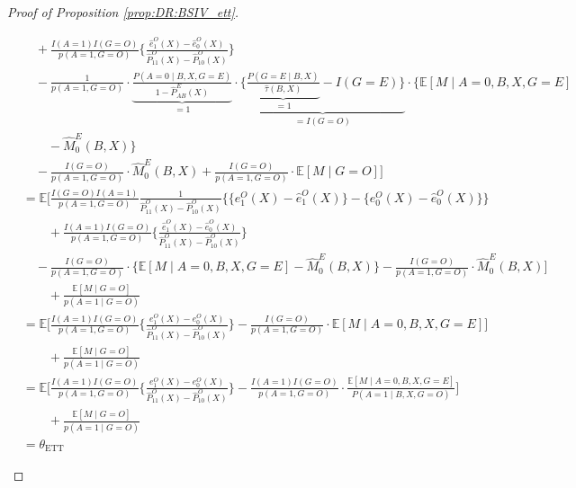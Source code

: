 \documentclass[10pt]{article}
\newcommand{\E}{\mathbb{E}}
\begin{document}
\begin{proof}[Proof of Proposition \ref{prop:DR:BSIV_ett}]
\begin{itemize}
{\begin{align*}
&\quad+\frac{I(A=1)I(G=O)}{p(A=1,G=O)}\Big\{\frac{\hat{e}_1^O(X)-\hat{e}_0^O(X)}{\hat{P}_{11}^O(X)-\hat{P}_{10}^O(X)}\Big\}\\
&\quad-\frac{1}{p(A=1,G=O)}\cdot\underbrace{\frac{P(A=0\mid B,X,G=E)}{1-\hat{P}_{AB}^E(X)}}_{=1}\cdot\underbrace{\Big\{\underbrace{\frac{P(G=E\mid B,X)}{\hat{\tau}(B,X)}}_{=1}-I(G=E)\Big\}}_{=I(G=O)}\cdot
\{\mathbb{E}[M\mid A=0,B,X,G=E]\\
&\quad\quad-\hat{M}_{0}^{E}(B,X)\}\\
&\quad-\frac{I(G=O)}{p(A=1,G=O)}\cdot \hat{M}_{0}^{E}(B,X)+\frac{I(G=O)}{p(A=1,G=O)}\cdot \mathbb{E}[M\mid G=O]\Big]\\
&=\E\Big[\frac{I(G=O)I(A=1)}{p(A=1,G=O)}\frac{1}{\hat{P}_{11}^O(X)-\hat{P}_{10}^O(X)}\bigg\{\{e_1^O(X)-\hat{e}_1^O(X)\}-\{e_0^O(X)-\hat{e}_0^O(X)\}\bigg\}\\
&\quad\quad+\frac{I(A=1)I(G=O)}{p(A=1,G=O)}\Big\{\frac{\hat{e}_1^O(X)-\hat{e}_0^O(X)}{\hat{P}_{11}^O(X)-\hat{P}_{10}^O(X)}\Big\}\\
&\quad-\frac{I(G=O)}{p(A=1,G=O)}\cdot
\{\mathbb{E}[M\mid A=0,B,X,G=E]-\hat{M}_{0}^{E}(B,X)\}-\frac{I(G=O)}{p(A=1,G=O)}\cdot \hat{M}_{0}^{E}(B,X)\Big]\\
&\quad\quad+\frac{\mathbb{E}[M\mid G=O]}{p(A=1\mid G=O)}\\
&=\E\Big[\frac{I(A=1)I(G=O)}{p(A=1,G=O)}\Big\{\frac{e_1^O(X)-e_0^O(X)}{\hat{P}_{11}^O(X)-\hat{P}_{10}^O(X)}\Big\}-\frac{I(G=O)}{p(A=1,G=O)}\cdot
\mathbb{E}[M\mid A=0,B,X,G=E]\Big]\\
&\quad\quad+\frac{\mathbb{E}[M\mid G=O]}{p(A=1\mid G=O)}\\
&=\E\Big[\frac{I(A=1)I(G=O)}{p(A=1,G=O)}\Big\{\frac{e_1^O(X)-e_0^O(X)}{\hat{P}_{11}^O(X)-\hat{P}_{10}^O(X)}\Big\}-\frac{I(A=1)I(G=O)}{p(A=1,G=O)}\cdot\frac{
\mathbb{E}[M\mid A=0,B,X,G=E]}{P(A=1\mid B,X,G=O)}\Big]\\
&\quad\quad+\frac{\mathbb{E}[M\mid G=O]}{p(A=1\mid G=O)}\\
&=\theta_{\text{ETT}}
\end{align*}}
\endgroup


\end{itemize}
\end{proof}
\end{document}
